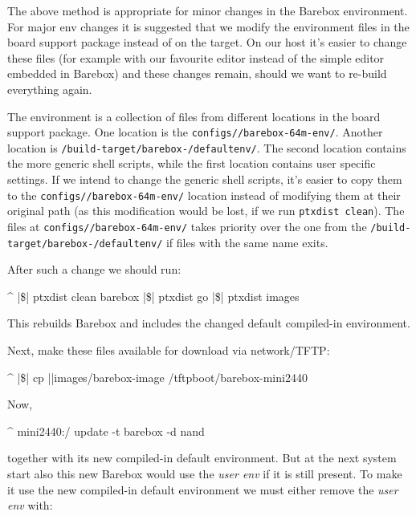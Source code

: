 The above method is appropriate for minor changes in the Barebox environment. For
major env changes it is suggested that we modify the environment files in the board
support package instead of on the target. On our host it's easier to change these files
(for example with our favourite editor instead of the simple editor embedded in
Barebox) and these changes remain, should we want to re-build everything again.

The environment is a collection of files from different locations in the board
support package. One location is the \texttt{configs/\ptxdistPlatformName /barebox-64m-env/}.
Another location is \texttt{\ptxdistPlatformDir /build-target/barebox-\ptxBareboxRev /defaultenv/}.
The second location contains the more generic shell scripts, while the first
location contains user specific settings. If we intend to change the generic shell
scripts, it's easier to copy them to the \texttt{configs/\ptxdistPlatformName /barebox-64m-env/}
location instead of modifying them at their original path (as this modification would
be lost, if we run \texttt{ptxdist clean}). The files at
\texttt{configs/\ptxdistPlatformName /barebox-64m-env/} takes priority over the
one from the \texttt{\ptxdistPlatformDir /build-target/barebox-\ptxBareboxRev /defaultenv/}
if files with the same name exits.

After such a change we should run:

\begin{ptxshell}[escapechar=|]{^}
|\$| ptxdist clean barebox
|\$| ptxdist go
|\$| ptxdist images
\end{ptxshell}

This rebuilds Barebox and includes the changed default compiled-in environment.

Next, make these files available for download via network/TFTP:

\begin{ptxshell}[escapechar=|]{^}
|\$| cp |\ptxdistPlatformDir |images/barebox-image /tftpboot/barebox-mini2440
\end{ptxshell}

Now,

\begin{ptxshell}[escapechar=|]{^}
mini2440:/ update -t barebox -d nand
\end{ptxshell}

together with its new compiled-in default environment. But at the next system
start also this new Barebox would use the \textit{user env} if it is still present.
To make it use the new compiled-in default environment we must either remove
the \textit{user env} with:

